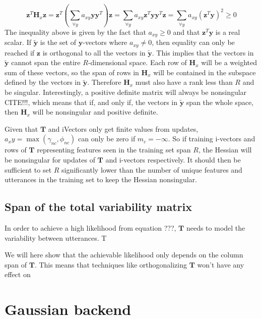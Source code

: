\begin{equation}
\mathbf{z}^T\mathbf{H}_x\mathbf{z} = \mathbf{z}^T\left(\sum_{\forall y}a_{xy}\mathbf{y}\mathbf{y}^T\right)\mathbf{z} 
= \sum_{\forall y}a_{xy}\mathbf{z}^T\mathbf{y}\mathbf{y}^T\mathbf{z} 
= \sum_{\forall y}a_{xy}\left(\mathbf{z}^T\mathbf{y}\right)^2 \geq 0 
\end{equation}
The inequality above is given by the fact that $a_{xy} \geq 0$ and that $\mathbf{z}^T\mathbf{y}$ is a real scalar. If $\mathbf{\tilde{y}}$ is the set of $\mathbf{y}$-vectors where $a_{xy} \neq 0$, then equality can only be reached if $\mathbf{z}$ is orthogonal to all the vectors in $\mathbf{\tilde{y}}$. This implies that the vectors in $\mathbf{\tilde{y}}$ cannot span the entire $R$-dimensional space. Each row of $\mathbf{H}_x$ will be a weighted sum of these vectors, so the span of rows in $\mathbf{H}_x$ will be contained in the subspace defined by the vectors in $\mathbf{\tilde{y}}$. Therefore $\mathbf{H}_x$ must also have a rank less than $R$ and be singular. Interestingly, a positive definite matrix will always be nonsingular CITE!!!, which means that if, and only if, the vectors in $\mathbf{\tilde{y}}$ span the whole space, then $\mathbf{H}_x$ will be nonsingular and positive definite. 

Given that $\mathbf{T}$ and iVectors only get finite values from updates, $a_xy = \max(\gamma_{nc}, \phi_{nc})$ can only be zero if $m_c=-\infty$. So if training i-vectors and rows of $\mathbf{T}$ representing features seen in the training set span $R$, the Hessian will be nonsingular for updates of $\mathbf{T}$ and i-vectors respectively. It should then be sufficient to set $R$ significantly lower than the number of unique features and utterances in the training set to keep the Hessian nonsingular.

\subsection{Span of the total variability matrix}

In order to achieve a high likelihood from equation ???, $\mathbf{T}$ needs to model the variability between utterances. T

We will here show that the achievable likelihood only depends on the column span of $\mathbf{T}$. This means that techniques like orthogonalizing $\mathbf{T}$ won't have any effect on 




\section{Gaussian backend}


